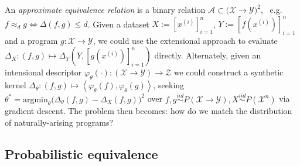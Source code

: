 \documentclass[11pt]{article}
\begin{document}
    \noindent An \textit{approximate equivalence relation} is a binary relation $\mathcal{A} \subset \mathcal (\mathcal X → \mathcal Y)^2$,~ e.g. $f \approx_{d} g \Leftrightarrow \mathbb \Delta(f, g) \leq d$. Given a dataset $X := [x^{(i)}]_{i=1}^n$, $Y := [f(x^{(i)})]_{i=1}^n$ and a program $g: \mathcal{X} → \mathcal{Y}$, we could use the extensional approach to evaluate $\Delta_X: (f, g) \mapsto \Delta_Y(Y, [g(x^{(i)})]_{i=1}^n)$ directly. Alternately, given an intensional descriptor $\varphi_θ(\cdot): (\mathcal X → \mathcal Y) → \mathcal Z$ we could construct a synthetic kernel $\Delta_θ: (f, g) \mapsto \left<\varphi_θ(f), \varphi_θ(g)\right>$, seeking $θ^* = \text{argmin}_θ\big(\Delta_θ(f, g) - \Delta_X(f, g)\big)^2$ over $f, g \overset{iid}{\sim} P(\mathcal X → \mathcal Y), X \overset{iid}{\sim} P(\mathcal X^n)$ via gradient descent. The problem then becomes: how do we match the distribution of naturally-arising programs?




    \pagebreak\subsection{Probabilistic equivalence}\label{sec:pr-eq}

\end{document}
